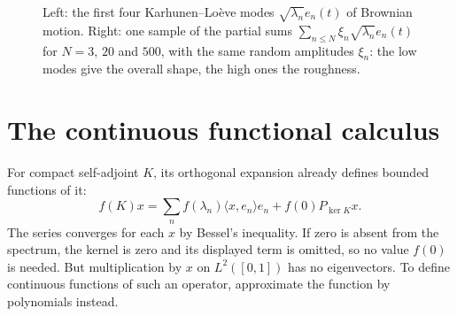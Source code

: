 \begin{figure}[ht]
\centering
{}
\caption{Left: the first four Karhunen--Lo\`eve modes $\sqrt{\lambda_n}e_n(t)$ of Brownian motion. Right: one sample of the partial sums $\sum_{n\le N}\xi_n\sqrt{\lambda_n}e_n(t)$ for $N=3$, $20$ and $500$, with the same random
amplitudes $\xi_n$: the low modes give the overall shape, the high ones the roughness.}
\label{fig:kl}
\end{figure}

\section{The continuous functional calculus}

For compact self-adjoint $K$, its orthogonal expansion already defines bounded functions of it:
\[
f(K)x=\sum_nf(\lambda_n)\langle x,e_n\rangle e_n+f(0)P_{\ker K}x.
\]
The series converges for each $x$ by Bessel's inequality. If zero is absent from the spectrum, the kernel is zero and its displayed term is omitted, so no value $f(0)$ is needed. But multiplication by $x$ on $L^2([0,1])$ has no eigenvectors. To define continuous functions of such an operator, approximate the function by polynomials instead.

